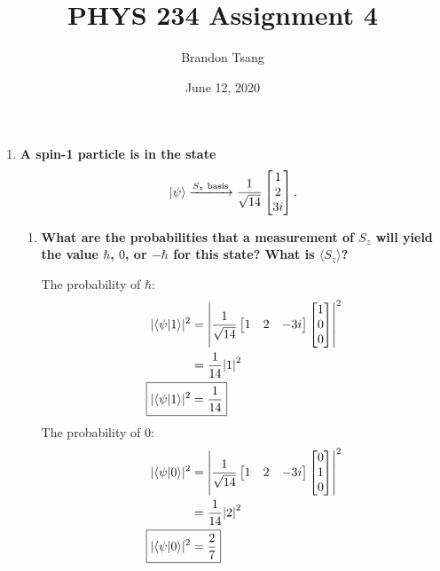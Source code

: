 \documentclass[11pt]{article}
\title{PHYS 234 Assignment 4}
\author{Brandon Tsang}
\date{June 12, 2020}
\DeclarePairedDelimiter\abs{\lvert}{\rvert}
\begin{document}
    \maketitle
    \begin{enumerate}[label=\textbf{\arabic*.}]
        \item{
            \textbf{\boldmath A spin-1 particle is in the state \[\ket{\psi}\xrightarrow{S_z\text{ basis}}\frac{1}{\sqrt{14}}\begin{bmatrix}1 \\ 2 \\ 3i\end{bmatrix}.\]}
            \begin{enumerate}[label=\textbf{(\alph*)}]
                \item{
                    \textbf{\boldmath What are the probabilities that a measurement of \(S_z\) will yield the value \(\hbar\), \(0\), or \(-\hbar\) for this state? What is \(\langle S_z\rangle\)?}
                    \par
                    The probability of \(\hbar\):
                    \begin{align*}
                        \abs{\braket{\psi|1}}^2&=\abs*{\frac{1}{\sqrt{14}}\begin{bmatrix}1 & 2 & -3i\end{bmatrix}\begin{bmatrix}1 \\ 0 \\ 0\end{bmatrix}}^2 \\
                        &=\frac{1}{14}\abs*{1}^2 \\
                        \Aboxed{\abs{\braket{\psi|1}}^2&=\frac{1}{14}}
                    \end{align*}
                    The probability of \(0\):
                    \begin{align*}
                        \abs{\braket{\psi|0}}^2&=\abs*{\frac{1}{\sqrt{14}}\begin{bmatrix}1 & 2 & -3i\end{bmatrix}\begin{bmatrix}0 \\ 1 \\ 0\end{bmatrix}}^2 \\
                        &=\frac{1}{14}\abs*{2}^2 \\
                        \Aboxed{\abs{\braket{\psi|0}}^2&=\frac{2}{7}}
                    \end{align*}
}
\end{enumerate}}
\end{enumerate}
\end{document}
